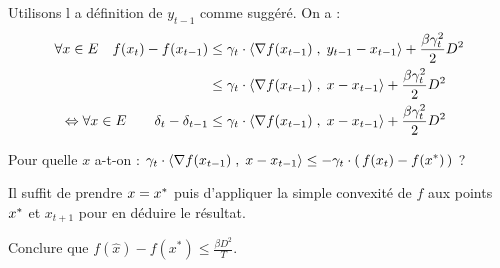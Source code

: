 \begin{rep}

Utilisons l
a définition de $y_{t-1}$ comme suggéré. On a :
\begin{align*}
  \forall x \in E \quad   f(x_{t})-f(x_{t-1}) &\leq
  \gamma_t\cdot\langle \operatorname{\nabla\!} f(x_{t-1}) \;,\;  y_{t-1}-x_{t-1} \rangle+\frac{\beta \gamma_t^2}{2}
  D^2\\
  &\leq   \gamma_t\cdot\langle \operatorname{\nabla\!} f(x_{t-1}) \;,\;  x-x_{t-1} \rangle+\frac{\beta \gamma_t^2}{2}
    D^2\\
    \Leftrightarrow \forall x \in E \qquad \delta_t - \delta_{t-1} &\leq \gamma_t\cdot\langle \operatorname{\nabla\!} f(x_{t-1}) \;,\;  x-x_{t-1} \rangle+\frac{\beta \gamma_t^2}{2}
      D^2
\end{align*}

Pour quelle $x$ a-t-on : $\displaystyle \gamma_t \cdot  \langle \operatorname{\nabla\!} f(x_{t-1}) \;,\;  x-x_{t-1} \rangle
\leq - \gamma_t \cdot  \left( \, f(x_t)-f(x^{*}) \, \right)$ ?

Il suffit de prendre $x = x^{*}$ puis d'appliquer la simple convexité de $f$ aux points
 $x^{*}$ et $x_{t+1}$ pour en déduire le résultat.

\end{rep}

\begin{qst}

Conclure que $\displaystyle f ( \hat { x } ) - f \left( x ^ { * } \right) \leq \frac { \beta D ^ { 2 } } { T }$.
\end{qst}

